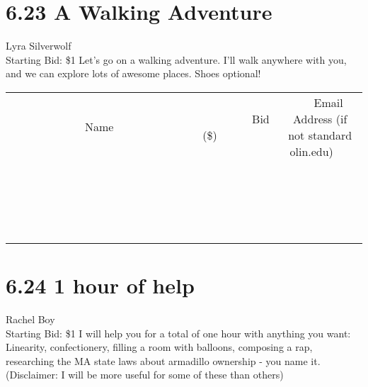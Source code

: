 \documentclass[11pt]{article}
\begin{document}
\section*{6.23 A Walking Adventure}
Lyra Silverwolf
\\
Starting Bid: \$1
\newline
Let's go on a walking adventure. I'll walk anywhere with you, and we can explore lots of awesome places. Shoes optional!
\\[3ex]
\begin{tabular}{c c c}
~~~~~~~~~~~~~Name~~~~~~~~~~~~~ & ~~~~~~~~~Bid (\$)~~~~~~~~~  & ~~~Email Address (if not standard olin.edu)~~~\\
 & & \\
\hline
 & & \\
\hline
 & & \\
\hline
 & & \\
\hline
 & & \\
\hline
 & & \\
\hline
 & & \\
\hline
 & & \\
\hline
 & & \\
\hline
 & & \\
\hline
 & & \\
\hline
 & & \\
\hline
 & & \\
\hline
 & & \\
\hline
 & & \\
\hline
 & & \\
\hline
 & & \\
\hline
 & & \\
\hline
 & & \\
\hline
\end{tabular}
\newpage
\section*{6.24 1 hour of help}
Rachel Boy
\\
Starting Bid: \$1
\newline
I will help you for a total of one hour with anything you want: Linearity, confectionery, filling a room with balloons, composing a rap, researching the MA state laws about armadillo ownership - you name it. (Disclaimer: I will be more useful for some of these than others)
\end{document}
